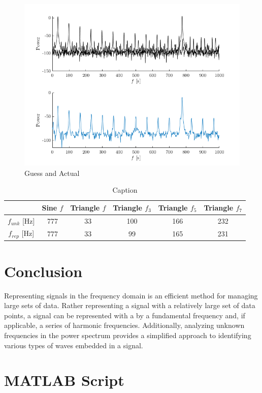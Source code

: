 \documentclass[letterpaper,12pt]{article}
\begin{document}
\begin{figure}[ht]
    \centering
    \includegraphics[width=.8\linewidth]{mysteryLab.png}
    \caption{Guess and Actual}
    \label{GuessActual}
\end{figure}

\begin{table}[ht]
    \centering
    \begin{tabular}{c|c||c|c|c|c}
         & Sine $f$ & Triangle $f$ & Triangle $f_3$ & Triangle $f_5$ & Triangle $f_7$ \\ \hline
         $f_{unk}$ [Hz] & 777  & 33  & 100 & 166 & 232\\ \hline
         $f_{rep}$ [Hz] & 777  & 33  & 99  & 165 & 231\\ \hline
    \end{tabular}
    \caption{Caption}
    \label{unknownSignalTable}
\end{table}

\section{Conclusion}
Representing signals in the frequency domain is an efficient method for managing large sets of data. Rather representing a signal with a relatively large set of data points, a signal can be represented with a by a fundamental frequency and, if applicable, a series of harmonic frequencies. Additionally, analyzing unknown frequencies in the power spectrum provides a simplified approach to identifying various types of waves embedded in a signal.

\newpage
\appendix

\section{MATLAB Script}

\end{document}
